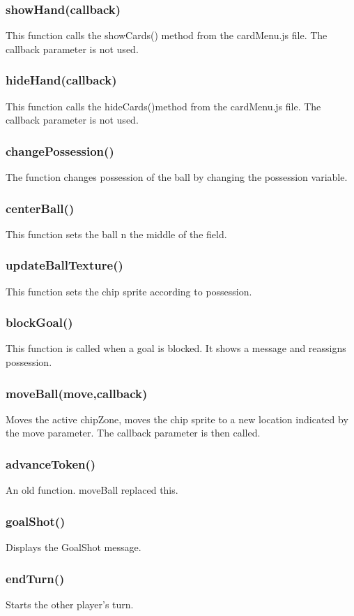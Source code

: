 \documentclass[12pt]{article}
\begin{document}
\subsubsection*{showHand(callback)}
This function calls the showCards() method from the cardMenu.js 
file. The callback parameter is not used. 
\subsubsection*{hideHand(callback)}
This function calls the hideCards()method from the cardMenu.js file.
The callback parameter is not used. 
\subsubsection*{changePossession()}
The function changes possession of the ball by changing the
 possession variable. 
\subsubsection*{centerBall()}
This function sets the ball n the middle of the field. 
\subsubsection*{updateBallTexture()}
This function sets the chip sprite according to possession. 
\subsubsection*{blockGoal()}
This function is called when a goal is blocked. It shows a message
and reassigns possession.
\subsubsection*{moveBall(move,callback)}
Moves the active chipZone, moves the chip sprite to a new location
indicated by the move parameter. The callback parameter is then
 called. 
\subsubsection*{advanceToken()}
An old function. moveBall replaced this. 
\subsubsection*{goalShot()}
Displays the GoalShot message. 
\subsubsection*{endTurn()}
Starts the other player's turn. 
\end{document}
